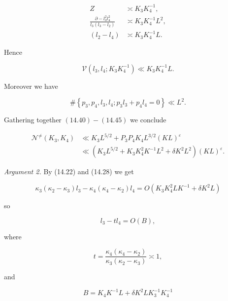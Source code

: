 \documentclass[10pt]{article}
\begin{document}
$$
\begin{aligned}
Z & \asymp K_{3} K_{4}^{-1}, \\
\frac{\partial-l_{3}^{2} l_{4}^{2}}{l_{3}\left(l_{3}-l_{2}\right)} & \asymp K_{3}K_{4}^{-1}L^{2}, \\
\left(l_{2}-l_{4}\right) & \asymp K_{3} K_{4}^{-1} L .
\end{aligned}
$$

Hence


\begin{equation*}
\mathscr{V}\left(l_{3}, l_{4} ; K_{3} K_{4}^{-1}\right) \ll K_{3} K_{4}^{-1} L . \tag{14.44}
\end{equation*}


Moreover we have


\begin{equation*}
\#\left\{p_{3}, p_{4}, l_{3}, l_{4} ; p_{3} l_{3}+p_{4} l_{4}=0\right\} \ll L^{2} . \tag{14.45}
\end{equation*}


Gathering together $(14.40)-(14.45)$ we conclude


\begin{align*}
\mathscr{N}^{\neq}(K_{3},K_{4}) & \ll K_{3} L^{5 / 2}+P_{3} P_{4} K_{4} L^{3 / 2}(K L)^{\varepsilon} \\
& \ll\left(K_{3} L^{5 / 2}+K_{3} K_{4}^{2} K^{-1} L^{2}+\delta K^{2} L^{2}\right)(K L)^{\varepsilon} . \tag{14.46}
\end{align*}


\medskip\noindent\textit{Argument 2.} By (14.22) and (14.28) we get

$$
\kappa_{3}\left(\kappa_{2}-\kappa_{3}\right) l_{3}-\kappa_{4}\left(\kappa_{4}-\kappa_{2}\right) l_{4}=O\left(K_{3} K_{4}^{2} L K^{-1}+\delta K^{2} L\right)
$$

so


\begin{equation*}
l_{3}-t l_{4}=O(B), \tag{14.47}
\end{equation*}


where


\begin{equation*}
t=\frac{\kappa_{4}\left(\kappa_{4}-\kappa_{2}\right)}{\kappa_{3}\left(\kappa_{2}-\kappa_{3}\right)} \asymp 1, \tag{14.48}
\end{equation*}


and


\begin{equation*}
B=K_{4} K^{-1} L+\delta K^{2} L K_{3}^{-1} K_{4}^{-1} \tag{14.49}
\end{equation*}
\end{document}
